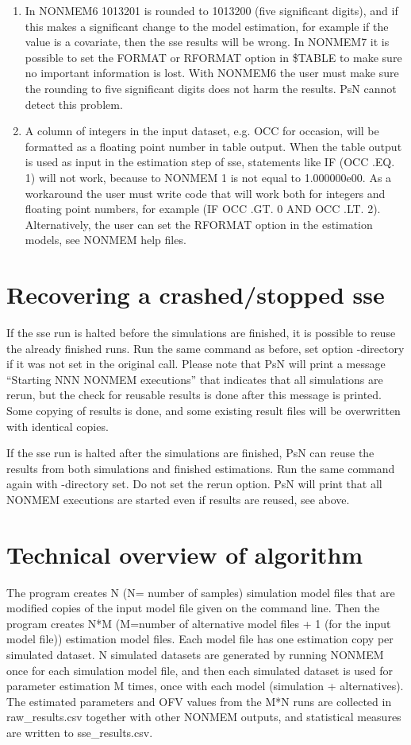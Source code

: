 \begin{enumerate}
	\item In NONMEM6 1013201 is rounded to 1013200 (five significant digits), and if this makes a significant change to the model estimation, for example if the value is a covariate, then the sse results will be wrong. In NONMEM7 it is possible to set the FORMAT or RFORMAT option in \$TABLE to make sure no important information is lost. With NONMEM6 the user must make sure the rounding to five significant digits does not harm the results. PsN cannot detect this problem.

	\item A column of integers in the input dataset, e.g. OCC for occasion, will be formatted as a floating point number in table output. When the table output is used as input in the estimation step of sse, statements like IF (OCC .EQ. 1) will not work, because to NONMEM 1 is not equal to 1.000000e00. As a workaround the user must write code that will work both for integers and floating point numbers, for example (IF OCC .GT. 0 AND OCC .LT. 2). Alternatively, the user can set the RFORMAT option in the estimation models, see NONMEM help files. 
\end{enumerate}

\section{Recovering a crashed/stopped sse}
If the sse run is halted before the simulations are finished, it is possible to reuse the already finished runs. Run the same command as before, set option -directory if it was not set in the original call. Please note that PsN will print a message “Starting NNN NONMEM executions” that indicates that all simulations are rerun, but the check for reusable results is done after this message is printed. Some copying of results is done, and some existing result files will be overwritten with identical copies. 

If the sse run is halted after the simulations are finished, PsN can reuse the results from both simulations and finished estimations. Run the same command again with -directory set. Do not set the rerun option. PsN will print that all NONMEM executions are started even if results are reused, see above. 

\section{Technical overview of algorithm}
The program creates N (N= number of samples) simulation model files that are modified copies of the input model file given on the command line. Then the program creates N*M (M=number of alternative model files + 1 (for the input model file)) estimation model files. Each model file has one estimation copy per simulated dataset. N simulated datasets are generated by running NONMEM once for each simulation model file, and then each simulated dataset is used for parameter estimation M times, once with each model (simulation + alternatives). The estimated parameters and OFV values from the M*N runs are collected in raw\_results.csv together with other NONMEM outputs, and statistical measures are written to sse\_results.csv. 

